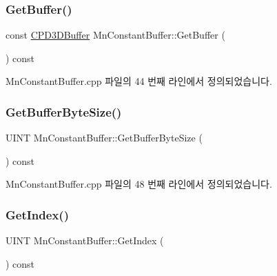 \subsubsection{\texorpdfstring{Get\+Buffer()}{GetBuffer()}}
{\footnotesize\ttfamily const \hyperlink{namespace_m_n_l_aab9c90a8c27ac6410a9cc7cd89efeef1}{C\+P\+D3\+D\+Buffer} Mn\+Constant\+Buffer\+::\+Get\+Buffer (\begin{DoxyParamCaption}{ }\end{DoxyParamCaption}) const}



Mn\+Constant\+Buffer.\+cpp 파일의 44 번째 라인에서 정의되었습니다.

\mbox{\label{class_m_n_l_1_1_mn_constant_buffer_ac5cec5ad72abe2c7659d4ee29d6b6cf9}} 
\subsubsection{\texorpdfstring{Get\+Buffer\+Byte\+Size()}{GetBufferByteSize()}}
{\footnotesize\ttfamily U\+I\+NT Mn\+Constant\+Buffer\+::\+Get\+Buffer\+Byte\+Size (\begin{DoxyParamCaption}{ }\end{DoxyParamCaption}) const}



Mn\+Constant\+Buffer.\+cpp 파일의 48 번째 라인에서 정의되었습니다.

\mbox{\label{class_m_n_l_1_1_mn_constant_buffer_a7b39b7ae15b314a6d12de1181d5ff180}} 
\subsubsection{\texorpdfstring{Get\+Index()}{GetIndex()}}
{\footnotesize\ttfamily U\+I\+NT Mn\+Constant\+Buffer\+::\+Get\+Index (\begin{DoxyParamCaption}{ }\end{DoxyParamCaption}) const}



